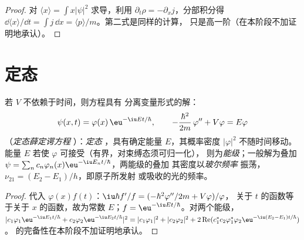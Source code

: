 \begin{proof}
对 $\langle x\rangle = \int x|\psi|^2$ 求导，利用 $\partial_t\rho =
-\partial_xj$，分部积分得 $\dd\langle x\rangle/\dd t = \int j\,\dd x
= \langle p\rangle/m$。第二式是同样的计算，
只是高一阶（在本阶段不加证明地承认）。
\end{proof}

\section{定态}

\begin{theorem}[定态]\label{thm:b2:schrodinger-wave-functions:stationary}
若 $V$ 不依赖于时间，则方程具有
分离变量形式的解：
\[
\psi(x,t) = \varphi(x)\,\eu^{-\iu Et/\hbar}, \qquad
-\frac{\hbar^2}{2m}\,\varphi'' + V\varphi = E\varphi
\]
（\emph{定态薛定谔方程}
）：\emph{定态}
，具有确定能量 $E$，其概率密度
$|\varphi|^2$ 不随时间移动。能量 $E$ 若使 $\varphi$
可接受（有界，对束缚态须可归一化），
则为\emph{能级}；一般解为叠加 $\psi =
\sum_nc_n\varphi_n(x)\eu^{-\iu E_nt/\hbar}$，两能级的叠加
其密度以\emph{玻尔频率}
振荡，$\nu_{21} = (E_2 - E_1)/h$，即原子所发射
或吸收的光的频率。
\end{theorem}

\begin{proof}
代入 $\varphi(x)f(t)$：$\iu\hbar f'/f = (-\hbar^2\varphi''/2m + V\varphi)/\varphi$，
关于 $t$ 的函数等于关于 $x$ 的函数，故为常数 $E$；$f
= \eu^{-\iu Et/\hbar}$。对两个能级，$|c_1\varphi_1\eu^{-\iu E_1t/\hbar} +
c_2\varphi_2\eu^{-\iu E_2t/\hbar}|^2 = |c_1\varphi_1|^2 + |c_2\varphi_2|^2 +
2\operatorname{Re}(c_1^*c_2\varphi_1^*\varphi_2\eu^{-\iu(E_2 - E_1)t/\hbar})$。
的完备性在本阶段不加证明地承认。
\end{proof}

